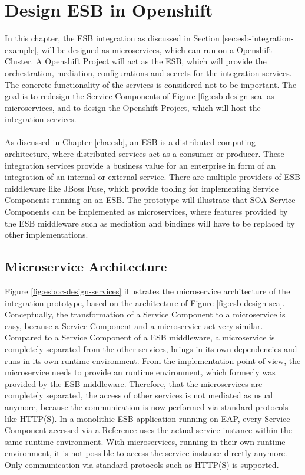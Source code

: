 \chapter{Design ESB in Openshift}
\label{cha:esboc}
In this chapter, the ESB integration as discussed in Section \vref{sec:esb-integration-example}, will be designed as microservices, which can run on a Openshift Cluster. A Openshift Project will act as the ESB, which will provide the orchestration, mediation, configurations and secrets for the integration services. The concrete functionality of the services is considered not to be important. The goal is to redesign the Service Components of Figure \vref{fig:esb-design-sca} as microservices, and to design the Openshift Project, which will host the integration services.
\\ \\
As discussed in Chapter \vref{cha:esb}, an ESB is a distributed computing architecture, where distributed services act as a consumer or producer. These integration services provide a business value for an enterprise in form of an integration of an internal or external service. There are multiple providers of ESB middleware like JBoss Fuse, which provide tooling for implementing Service Components running on an ESB. The prototype will illustrate that SOA Service Components can be implemented as microservices, where features provided by the ESB middleware such as mediation and bindings will have to be replaced by other implementations.

\section{Microservice Architecture}
Figure \vref{fig:esboc-design-services} illustrates the microservice architecture of the integration prototype, based on the architecture of Figure \vref{fig:esb-design-sca}. Conceptually, the transformation of a Service Component to a microservice is easy, because a Service Component and a microservice act very similar. Compared to a Service Component of a ESB middleware, a microservice is completely separated from the other services, brings in its own dependencies and runs in its own runtime environment. From the implementation point of view, the microservice needs to provide an runtime environment, which formerly was provided by the ESB middleware. Therefore, that the microservices are completely separated, the access of other services is not mediated as usual anymore, because the communication is now performed via standard protocols like HTTP(S). In a monolithic ESB application running on EAP, every Service Component accessed via a Reference uses the actual service instance within the same runtime environment. With microservices, running in their own runtime environment, it is not possible to access the service instance directly anymore. Only communication via standard protocols such as HTTP(S) is supported.

